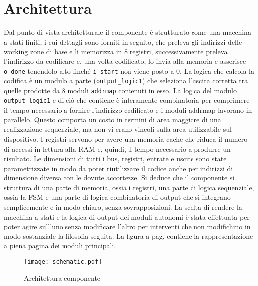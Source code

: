 \documentclass [a4paper, 12pt]{article}
\begin{document}
\section{Architettura}
Dal punto di vista architetturale il componente \`e strutturato come una macchina a stati finiti, i cui dettagli sono forniti in seguito, che preleva gli indirizzi delle working zone di base e li memorizza in 8 registri, successivamente preleva l'indirizzo da codificare e, una volta codificato, lo invia alla memoria e asserisce \texttt{o\_done} tenendolo alto finch\'e \texttt{i\_start} non viene posto a 0. La logica che calcola la codifica \`e un modulo a parte (\texttt{output\_logic1}) che seleziona l'uscita corretta tra quelle prodotte da 8 moduli \texttt{addrmap} contenuti in esso. La logica del modulo \texttt{output\_logic1} e di ci\`o che contiene \`e interamente combinatoria per comprimere il tempo necessario a fornire l'indirizzo codificato e i moduli addrmap lavorano in parallelo. Questo comporta un costo in termini di area maggiore di una realizzazione sequenziale, ma non vi erano vincoli sulla area utilizzabile sul dispositivo. I registri servono per avere una memoria cache che riduca il numero di accessi in lettura alla RAM e, quindi, il tempo necessario a produrre un risultato. Le dimensioni di tutti i bus, registri, entrate e uscite sono state parametrizzate in modo da poter riutilizzare il codice anche per indirizzi di dimensione diversa con le dovute accortezze. Si deduce che il componente si struttura di una parte di memoria, ossia i registri, una parte di logica sequenziale, ossia la FSM e una parte di logica combinatoria di output che si integrano semplicemente e in modo chiaro, senza sovrapposizioni. La scelta di rendere la macchina a stati e la logica di output dei moduli autonomi \`e stata effettuata per poter agire sull'uno senza modificare l'altro per interventi che non modifichino in modo sostanziale la filosofia seguita. La figura a pag. \pageref{fig:figure3} contiene la rappresentazione a piena pagina dei moduli principali.

\begin{figure}[H]
\begin{center}
\texttt{[image: schematic.pdf]}
\end{center}
\caption{Architettura componente}
\label{fig:figure3}
\end{figure}
\end{document}
